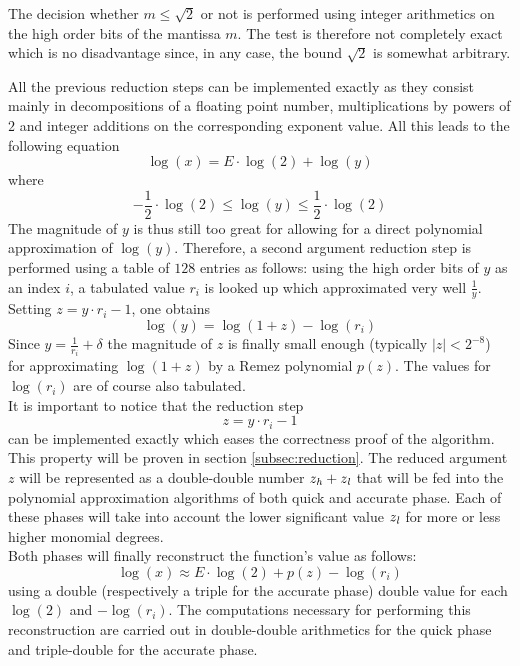 The decision whether $m \leq \sqrt{2}$ or not is performed using integer arithmetics on 
the high order bits of the mantissa $m$. The test is therefore not completely exact which is no
disadvantage since, in any case, the bound $\sqrt{2}$ is somewhat arbitrary.\par
All the previous reduction steps can be implemented exactly as they consist mainly in decompositions
of a floating point number, multiplications by powers of $2$ and integer additions on the corresponding exponent value.
All this leads to the following equation 
$$\log\left( x \right) = E \cdot \log\left( 2 \right) + \log\left( y \right)$$
where
$$-\frac{1}{2} \cdot \log\left( 2 \right) \leq \log\left( y \right) \leq \frac{1}{2} \cdot \log\left( 2 \right)$$
The magnitude of $y$ is thus still too great for allowing for a direct polynomial approximation of $\log\left(y\right)$.
Therefore, a second argument reduction step is performed using a table of $128$ entries as follows:
using the high order bits of $y$ as an index $i$, a tabulated value $r_i$ is looked up which approximated very well
$\frac{1}{y}$. Setting $z = y \cdot r_i - 1$, one obtains 
$$\log\left( y \right) = \log\left( 1 + z \right) - \log\left( r_i \right)$$
Since $y = \frac{1}{r_i} + \delta$ the magnitude of $z$ is finally
small enough (typically $\left \vert z \right \vert < 2^{-8}$) for
approximating $\log\left(1+z\right)$ by a Remez polynomial
$p\left(z\right)$. The values for $\log\left(r_i\right)$ are of course also tabulated.\\
It is important to notice that the reduction step 
$$z = y \cdot r_i - 1$$ 
can be implemented exactly which eases the correctness proof of the algorithm. This property will be proven in 
section \ref{subsec:reduction}. The reduced argument $z$ will
be represented as a double-double number $z_{\mathit{h}} + z_{\mathit{l}}$ that will be fed into the polynomial approximation 
algorithms of both quick and accurate phase. Each of these phases will take into account the lower significant value 
$z_{\mathit{l}}$ for more or less 
higher monomial degrees.\\
Both phases will finally reconstruct the function's value as follows:
$$\log\left( x \right) \approx E \cdot \log\left( 2 \right) + p\left( z \right) - \log\left( r_i \right)$$
using a double (respectively a triple for the accurate phase) double value for each 
$\log\left( 2 \right)$ and $-\log\left( r_i \right)$. The computations necessary for performing this reconstruction
are carried out in double-double arithmetics for the quick phase and triple-double for the accurate phase.\\~\par
